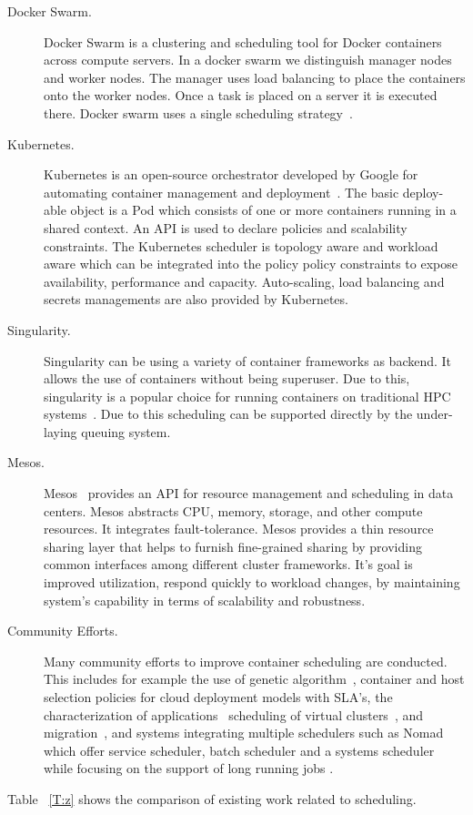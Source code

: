 \documentclass[final,5p,times,twocolumn]{elsarticle}
\begin{document}
\begin{description}


\item[Docker Swarm.] Docker Swarm is a clustering and scheduling
tool for Docker containers \cite{Dockerswarmengine2018} across compute
servers. In a docker swarm we distinguish manager nodes and worker
nodes. The manager uses load balancing to place the containers onto
the worker nodes. Once a task is placed on a server it is executed
there.  Docker swarm uses a single scheduling
strategy~\cite{Dockerswarm2018}.



\item[Kubernetes.] Kubernetes is an open-source orchestrator
developed by Google for automating container management and
deployment~\cite{Kubernates2018}. The basic deploy-able object is a
Pod which consists of one or more containers running in a shared
context. An API is used to declare policies and scalability
constraints. The Kubernetes scheduler is topology aware and workload
aware which can be integrated into the policy policy constraints to
expose availability, performance and capacity. Auto-scaling, load
balancing and secrets managements are also provided by Kubernetes.

\item[Singularity.] Singularity can be using a variety of
container frameworks as backend. It allows the use of containers
without being superuser. Due to this, singularity is a popular choice
for running containers on traditional HPC
systems~\cite{www-singularity}. Due to this scheduling can be
supported directly by the under-laying queuing system.


\item[Mesos.] Mesos~\cite{hindman2011mesos,Mesos2018} provides an
API for resource management and scheduling in data centers. Mesos
abstracts CPU, memory, storage, and other compute resources. It
integrates fault-tolerance. Mesos provides a thin resource sharing
layer that helps to furnish fine-grained sharing by providing common
interfaces among different cluster frameworks. It's goal is improved
utilization, respond quickly to workload changes, by maintaining
system's capability in terms of scalability and robustness.


\item[Community Efforts.] Many community efforts to improve
container scheduling are conducted. This includes for example the use
of genetic algorithm~\cite{guerrero2018genetic}, container and host
selection policies for cloud deployment models \cite{hanafy2017novel}
with SLA's, the characterization of
applications~\cite{medel2017client} scheduling of virtual
clusters~\cite{dziurzanskivalue}, and migration~\cite{Flocker2018},
and systems integrating multiple schedulers such as Nomad which offer
service scheduler, batch scheduler and a systems scheduler while
focusing on the support of long running jobs \cite{Nomad2018}.  
\end{description}
Table ~\ref{T:z} shows the comparison of existing work related to scheduling. 
\end{document}
